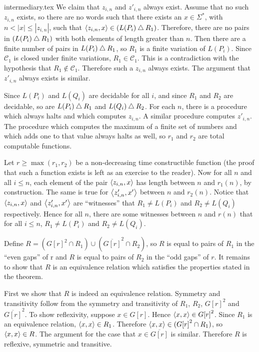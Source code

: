 \begin{filecontents}{intermediary.tex}
  We claim that $z_{i,n}$ and $z'_{i,n}$ always exist.
  Assume that no such $z_{i,n}$ exists, so there are no words such that there exists an $x\in\Sigma^*$, with $n<|x|\leq|z_{i,n}|$, such that $\pair{z_{i,n}}{x}\in(L(P_i)\symdiff R_1)$.
  Therefore, there are no pairs in $(L(P_i)\symdiff R_1)$ with both elements of length greater than $n$.
  Then there are a finite number of pairs in $L(P_i)\symdiff R_1$, so $R_1$ is a finite variation of $L(P_i)$.
  Since $\mathcal{C}_1$ is closed under finite variations, $R_1\in\mathcal{C}_1$.
  This is a contradiction with the hypothesis that $R_1\notin\mathcal{C}_1$.
  Therefore such a $z_{i,n}$ always exists.
  The argument that $z'_{i,n}$ always exists is similar.

  Since $L(P_i)$ and $L(Q_i)$ are decidable for all $i$, and since $R_1$ and $R_2$ are decidable, so are $L(P_i)\symdiff R_1$ and $L(Q_i)\symdiff R_2$.
  For each $n$, there is a procedure which always halts and which computes $z_{i,n}$.
  A similar procedure computes $z'_{i,n}$.
  The procedure which computes the maximum of a finite set of numbers and which adds one to that value always halts as well, so $r_1$ and $r_2$ are total computable functions.

  Let $r\ge \max(r_1,r_2)$ be a non-decreasing time constructible function (the proof that such a function exists is left as an exercise to the reader).
  Now for all $n$ and all $i\leq n$, each element of the pair $\pair{z_{i,n}}{x}$ has length between $n$ and $r_1(n)$, by construction.
  The same is true for $\pair{z'_{i,n}}{x'}$ between $n$ and $r_2(n)$.
  Notice that $\pair{z_{i,n}}{x}$ and $\pair{z'_{i,n}}{x'}$ are ``witnesses'' that $R_1\neq L(P_i)$ and $R_2\neq L(Q_i)$ respectively.
  Hence for all $n$, there are some witnesses between $n$ and $r(n)$ that for all $i\leq n$, $R_1\neq L(P_i)$ and $R_2\neq L(Q_i)$.

  Define $R=({G[r]}^2\cap R_1)\cup(\overline{G[r]}^2\cap R_2)$, so $R$ is equal to pairs of $R_1$ in the ``even gaps'' of r and $R$ is equal to pairs of $R_2$ in the ``odd gaps'' of $r$.
  It remains to show that $R$ is an equivalence relation which satisfies the properties stated in the theorem.

  First we show that $R$ is indeed an equivalence relation.
  Symmetry and transitivity follow from the symmetry and transitivity of $R_1$, $R_2$, ${G[r]}^2$ and $\overline{G[r]}^2$.
  To show reflexivity, suppose $x\in G[r]$.
  Hence $\pair{x}{x}\in {G[r]}^2$.
  Since $R_1$ is an equivalence relation, $\pair{x}{x}\in R_1$.
  Therefore $\pair{x}{x}\in({G[r]}^2\cap R_1)$, so $\pair{x}{x}\in R$.
  The argument for the case that $x\in\overline{G[r]}$ is similar.
  Therefore $R$ is reflexive, symmetric and transitive.


\end{filecontents}
